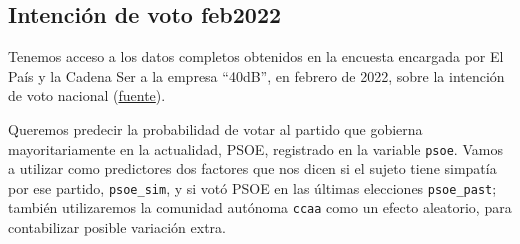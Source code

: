 \documentclass[
]{book}
\begin{document}
\hypertarget{intenciuxf3n-de-voto-feb2022}{%
\subsection{Intención de voto feb2022}\label{intenciuxf3n-de-voto-feb2022}}

Tenemos acceso a los datos completos obtenidos en la encuesta encargada por El País y la Cadena Ser a la empresa ``40dB'', en febrero de 2022, sobre la intención de voto nacional (\href{https://elpais.com/espana/2022-02-07/consulte-todos-los-datos-internos-de-la-encuesta-de-el-pais-cuestionarios-cruces-y-respuestas-individuales.html}{fuente}).

Queremos predecir la probabilidad de votar al partido que gobierna mayoritariamente en la actualidad, PSOE, registrado en la variable \texttt{psoe}. Vamos a utilizar como predictores dos factores que nos dicen si el sujeto tiene simpatía por ese partido, \texttt{psoe\_sim}, y si votó PSOE en las últimas elecciones \texttt{psoe\_past}; también utilizaremos la comunidad autónoma \texttt{ccaa} como un efecto aleatorio, para contabilizar posible variación extra.
\end{document}

